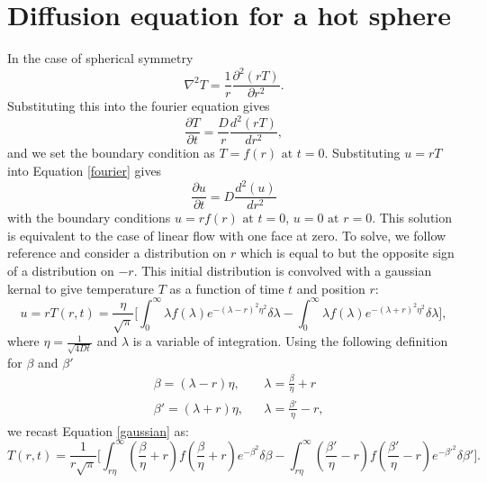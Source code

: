 \chapter{\label{app:2-diffusion}Diffusion equation for a hot sphere}

In the case of spherical symmetry
\begin{equation}
\nabla^2T = \frac{1}{r}\frac{\partial^2(rT)}{\partial r^2}.
\end{equation}
Substituting this into the fourier equation gives
\begin{equation} \label{fourier}
\frac{\partial T}{\partial t} = \frac{D}{r}\frac{d^2(rT)}{d r^2},
\end{equation} 
and we set the boundary condition as  $T = f(r) \text{ at } t=0$.
Substituting $u = rT$ into Equation \ref{fourier} gives
\begin{equation}
\frac{\partial u}{\partial t} = D\frac{d^2(u)}{dr^2}
\end{equation}
with the boundary conditions $u = rf(r) \text{ at } t=0$, $u = 0 \text{ at } r=0$.
This solution is equivalent to the case of linear flow with one face at zero. To solve, we follow reference \cite{Ingersoll1948} and consider a distribution on $r$ which is equal to but the opposite sign of a distribution on $-r$. This initial distribution is convolved with a gaussian kernal to give temperature $T$ as a function of time $t$ and position $r$: 
\begin{equation} \label{gaussian}
u = rT(r,t) = \frac{\eta}{\sqrt{\pi}} \bigg[ \int_0^\infty \lambda f(\lambda) e^{-(\lambda-r)^2\eta^2}\delta \lambda - \int_0^\infty \lambda f(\lambda) e^{-(\lambda+r)^2\eta^2}\delta \lambda \bigg],
\end{equation}
where $\eta = \frac{1}{\sqrt{4Dt}}$ and $\lambda$ is a variable of integration.
Using the following definition for $\beta$ and $\beta'$
\begin{equation}
\begin{aligned}
& \beta = (\lambda-r)\eta, && \lambda = \frac{\beta}{\eta} + r \\
& \beta' = (\lambda+r)\eta, && \lambda = \frac{\beta'}{\eta} - r, 
\end{aligned}
\end{equation}
we recast Equation \ref{gaussian} as:
\begin{equation}
T(r,t) = \frac{1}{r\sqrt{\pi}} \bigg[ \int^\infty_{r \eta}  \left( \frac{\beta}{\eta} + r\right) f\left( \frac{\beta}{\eta} + r\right)e^{-\beta^2}\delta \beta - \int^\infty_{r \eta}  \left( \frac{\beta'}{\eta} - r\right) f\left( \frac{\beta'}{\eta} - r\right)e^{-\beta'^2} \delta \beta' \bigg].
\end{equation}
